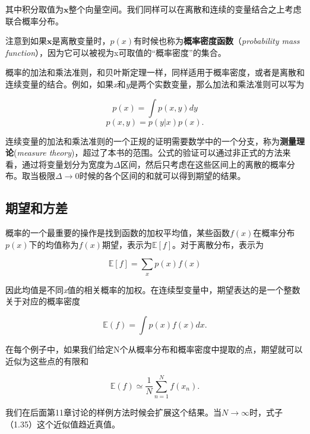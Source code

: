 	其中积分取值为$\mathbf{x}$整个向量空间。我们同样可以在离散和连续的变量结合之上考虑联合概率分布。
	
	注意到如果$\mathbf{x}$是离散变量时，$p(x)$有时候也称为\textbf{概率密度函数}（\textit{probability mass function}），因为它可以被视为x可取值的“概率密度”的集合。
	
	概率的加法和乘法准则，和贝叶斯定理一样，同样适用于概率密度，或者是离散和连续变量的结合。例如，如果\textit{x}和\textit{y}是两个实数变量，那么加法和乘法准则可以写为
	
	\begin{equation}
	p(x) = \int p(x, y) dy
	\end{equation}
	\begin{equation}
	p(x, y) = p(y|x)p(x).
	\end{equation}
	
	连续变量的加法和乘法准则的一个正规的证明需要数学中的一个分支，称为\textbf{测量理论}(\textit{measure theory})，超过了本书的范围。公式的验证可以通过非正式的方法来看，通过将变量划分为宽度为$\Delta$区间，然后只考虑在这些区间上的离散的概率分布。取当极限$\Delta \to 0$时候的各个区间的和就可以得到期望的结果。
	
\subsection{期望和方差}
	概率的一个最重要的操作是找到函数的加权平均值，某些函数$f(x)$在概率分布$p(x)$下的均值称为$f(x)$期望，表示为$\mathbb{E}[f]$。对于离散分布，表示为
	
	\begin{equation}
	\mathbb{E}[f] = \sum_x p(x)f(x)
	\end{equation}
	
	因此均值是不同\textit{x}值的相关概率的加权。在连续型变量中，期望表达的是一个整数关于对应的概率密度
	
	\begin{equation}
	\mathbb{E}(f) = \int p(x) f(x) dx.
	\end{equation}
	
	在每个例子中，如果我们给定N个从概率分布和概率密度中提取的点，期望就可以近似为这些点的有限和
	
	\begin{equation}
	\mathbb{E}(f) \simeq \frac{1}{N} \sum_{n = 1}^{N} f(x_n).
	\end{equation}
	
	我们在后面第11章讨论的样例方法时候会扩展这个结果。当$N \to \infty$时，式子（1.35）这个近似值趋近真值。
	

